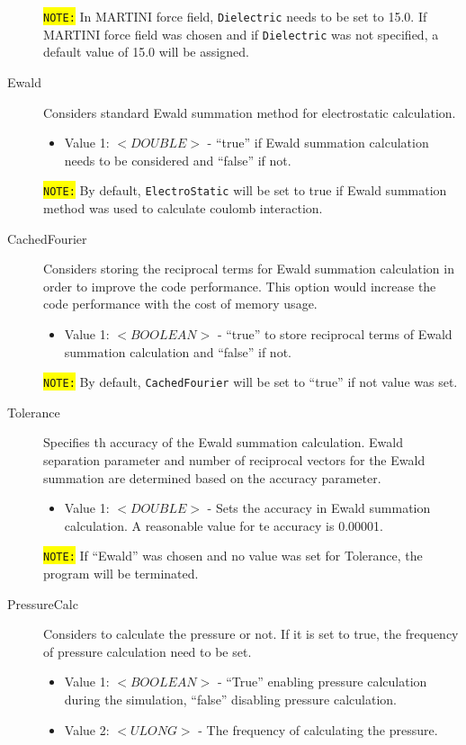 \begin{description}
\begin{itemize}
	\end{itemize}
	\colorbox{yellow}{\texttt{NOTE:}} In MARTINI force field, \texttt{Dielectric} needs to be set to 15.0. If MARTINI force field was chosen and if \texttt{Dielectric} was not specified, a default value of 15.0 will be assigned.
\item [Ewald] Considers standard Ewald summation method for electrostatic calculation.
	\begin{itemize}
	\item Value 1: $<DOUBLE>$ - ``true'' if Ewald summation calculation needs to be considered and ``false'' if not.
	\end{itemize}
	\colorbox{yellow}{\texttt{NOTE:}} By default, \texttt{ElectroStatic} will be set to true if Ewald summation method was used to calculate coulomb interaction.
\item [CachedFourier] Considers storing the reciprocal terms for Ewald summation calculation in order to improve the code performance. This option would increase the code performance with the cost of memory usage.
	\begin{itemize}
	\item Value 1: $<BOOLEAN>$ - ``true'' to store reciprocal terms of Ewald summation calculation and ``false'' if not.
	\end{itemize}
	\colorbox{yellow}{\texttt{NOTE:}} By default, \texttt{CachedFourier} will be set to ``true'' if not value was set.
\item [Tolerance] Specifies th accuracy of the Ewald summation calculation. Ewald separation parameter and number of reciprocal vectors for the Ewald summation are determined based on the accuracy parameter.
	\begin{itemize}
	\item Value 1: $<DOUBLE>$ - Sets the accuracy in Ewald summation calculation. A reasonable value for te accuracy is 0.00001.
	\end{itemize}
	\colorbox{yellow}{\texttt{NOTE:}} If ``Ewald'' was chosen and no value was set for Tolerance, the program will be terminated.
\item [PressureCalc] Considers to calculate the pressure or not. If it is set to true, the frequency of pressure calculation need to be set.
	\begin{itemize}
	\item Value 1: $<BOOLEAN>$ - ``True'' enabling pressure calculation during the simulation, ``false'' disabling pressure calculation.
	\item Value 2: $<ULONG>$ - The frequency of calculating the pressure.

\end{itemize}
\end{description}
